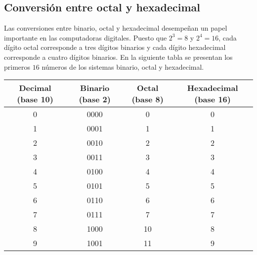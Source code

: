 \subsection{Conversión entre octal y hexadecimal}
Las conversiones entre binario, octal y hexadecimal desempeñan un papel importante en las computadoras digitales. Puesto que $2^3=8$ y $2^4=16$, cada dígito octal corresponde a tres dígitos binarios y cada dígito hexadecimal corresponde a cuatro dígitos binarios. En la siguiente tabla se presentan los primeros $16$ números de los sistemas binario, octal y hexadecimal.
\begin{table}[H]
    \centering
    \begin{tabular}{|c|c|c|c|} %
        \hline
        \textbf{Decimal (base 10)} & \textbf{Binario (base 2)} & \textbf{Octal (base 8)} & \textbf{Hexadecimal (base 16)} \\ \hline
        0                           & 0000                      & 0                       & 0                              \\ \hline
        1                           & 0001                      & 1                       & 1                              \\ \hline
        2                           & 0010                      & 2                       & 2                              \\ \hline
        3                           & 0011                      & 3                       & 3                              \\ \hline
        4                           & 0100                      & 4                       & 4                              \\ \hline
        5                           & 0101                      & 5                       & 5                              \\ \hline
        6                           & 0110                      & 6                       & 6                              \\ \hline
        7                           & 0111                      & 7                       & 7                              \\ \hline
        8                           & 1000                      & 10                      & 8                              \\ \hline
        9                           & 1001                      & 11                      & 9                              \\ \hline

\end{tabular}
\end{table}

